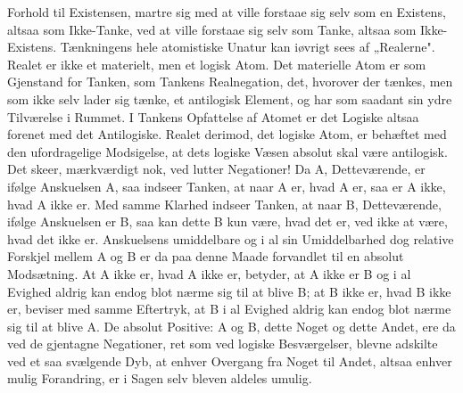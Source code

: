 \documentclass[12pt]{book}
\newcommand{\opage}[1]{\marginnote{\footnotesize\textit{[#1]}}}
\begin{document}
{Forhold til Existensen, martre sig med at ville forstaae sig selv som en Existens,
altsaa som Ikke-Tanke, ved at ville forstaae sig selv som Tanke, altsaa som
Ikke-Existens. Tænkningens hele atomistiske Unatur kan iøvrigt sees af „Realerne".
Realet er ikke et materielt, men et logisk Atom. Det materielle Atom er som Gjenstand
for Tanken, som Tankens Realnegation, det, hvorover der tænkes, men som ikke selv
lader sig tænke, et antilogisk Element, og har som saadant sin ydre Tilværelse i
Rummet. I Tankens Opfattelse af Atomet er det Logiske altsaa forenet med det
Antilogiske. Realet derimod, det logiske Atom, er behæftet med den ufordragelige
Modsigelse, at dets logiske Væsen absolut skal være antilogisk.} Det skeer,
\opage{17} mærkværdigt nok, ved lutter Negationer! Da A, Detteværende, er ifølge Anskuelsen A,
saa indseer Tanken, at naar
\opage{18} A er, hvad A er, saa er A ikke, hvad A ikke er. Med samme Klarhed indseer Tanken, at
naar B, Detteværende, ifølge Anskuelsen er B, saa kan dette B kun være, hvad det er,
ved ikke at være, hvad det ikke er. Anskuelsens umiddelbare og i al sin Umiddelbarhed
dog relative Forskjel mellem A og B er da paa denne Maade forvandlet til en absolut
Modsætning. At A ikke er, hvad A ikke er, betyder, at A ikke er B og i al Evighed
aldrig kan endog blot nærme sig til at blive B; at B ikke er, hvad B ikke er, beviser
med samme Eftertryk, at B i al Evighed aldrig kan endog blot nærme sig til at blive A.
De absolut Positive: A og B, dette Noget og dette Andet, ere da ved de gjentagne
Negationer, ret som ved logiske Besværgelser, blevne adskilte ved et saa svælgende
Dyb, at enhver Overgang fra Noget til Andet, altsaa enhver mulig Forandring, er i
Sagen selv bleven aldeles umulig.
\end{document}
